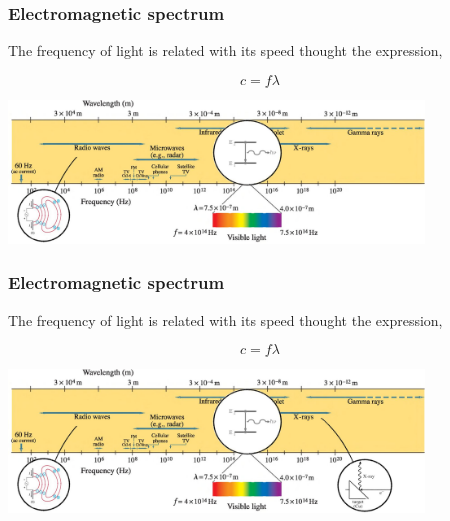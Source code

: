 \documentclass[]{beamer}
\begin{document}
\begin{frame}

\frametitle{Electromagnetic spectrum}

The frequency of light is related with its speed thought the expression,

\begin{equation*}
c=f\lambda
\end{equation*}

  \begin{center}
  \includegraphics[height=1.5in]{images5/spectrum3.jpg}
\end{center}



  \end{frame}



\begin{frame}

\frametitle{Electromagnetic spectrum}

The frequency of light is related with its speed thought the expression,

\begin{equation*}
c=f\lambda
\end{equation*}

  \begin{center}
  \includegraphics[height=1.5in]{images5/spectrum4.jpg}
\end{center}



  \end{frame}

\end{document}
